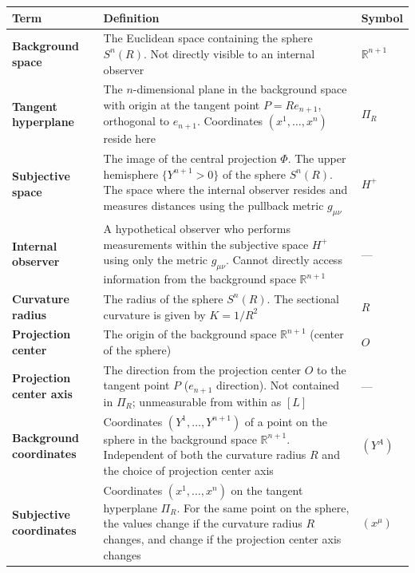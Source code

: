 \documentclass[a4paper,11pt]{article}
\theoremstyle{definition}
\begin{document}
{\def\LTcaptype{table} %
\begin{longtable}[]{@{}
  >{\raggedright\arraybackslash}p{}
  >{\raggedright\arraybackslash}p{}
  >{\raggedright\arraybackslash}p{}@{}}
\toprule\noalign{}
\begin{minipage}[b]{\linewidth}\raggedright
Term
\end{minipage} & \begin{minipage}[b]{\linewidth}\raggedright
Definition
\end{minipage} & \begin{minipage}[b]{\linewidth}\raggedright
Symbol
\end{minipage} \\
\midrule\noalign{}
\endhead
\bottomrule\noalign{}
\endlastfoot
\textbf{Background space} & The Euclidean space containing the sphere \(S^n(R)\). Not directly visible to an internal observer & \(\mathbb{R}^{n+1}\) \\
\textbf{Tangent hyperplane} & The \(n\)-dimensional plane in the background space with origin at the tangent point \(P = Re_{n+1}\), orthogonal to \(e_{n+1}\). Coordinates \((x^1, \ldots, x^n)\) reside here & \(\Pi_R\) \\
\textbf{Subjective space} & The image of the central projection \(\Phi\). The upper hemisphere \(\{Y^{n+1} > 0\}\) of the sphere \(S^n(R)\). The space where the internal observer resides and measures distances using the pullback metric \(g_{\mu\nu}\) & \(H^+\) \\
\textbf{Internal observer} & A hypothetical observer who performs measurements within the subjective space \(H^+\) using only the metric \(g_{\mu\nu}\). Cannot directly access information from the background space \(\mathbb{R}^{n+1}\) & --- \\
\textbf{Curvature radius} & The radius of the sphere \(S^n(R)\). The sectional curvature is given by \(K = 1/R^2\) & \(R\) \\
\textbf{Projection center} & The origin of the background space \(\mathbb{R}^{n+1}\) (center of the sphere) & \(O\) \\
\textbf{Projection center axis} & The direction from the projection center \(O\) to the tangent point \(P\) (\(e_{n+1}\) direction). Not contained in \(\Pi_R\); unmeasurable from within as \([L]\) & --- \\
\textbf{Background coordinates} & Coordinates \((Y^1, \ldots, Y^{n+1})\) of a point on the sphere in the background space \(\mathbb{R}^{n+1}\). Independent of both the curvature radius \(R\) and the choice of projection center axis & \((Y^A)\) \\
\textbf{Subjective coordinates} & Coordinates \((x^1, \ldots, x^n)\) on the tangent hyperplane \(\Pi_R\). For the same point on the sphere, the values change if the curvature radius \(R\) changes, and change if the projection center axis changes & \((x^\mu)\) \\
\end{longtable}
}
\end{document}
